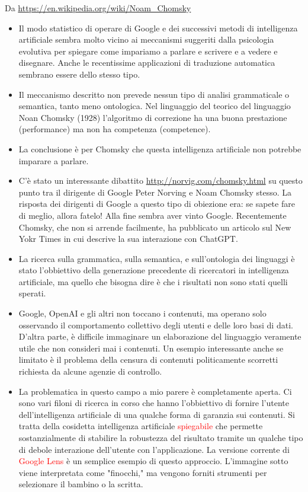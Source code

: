 \documentclass[xcolor=svgnames]{beamer}
\newcommand{\rosso}[1]{\textcolor{red}{#1}}
\renewcommand{\emph}{\rosso}
\begin{document}
\begin{frame}
  {\tiny Da \url{https://en.wikipedia.org/wiki/Noam_Chomsky}}
  
\begin{itemize}
    \item Il modo statistico di operare di Google e dei successivi metodi di intelligenza artificiale sembra molto vicino ai meccanismi suggeriti dalla psicologia evolutiva per spiegare come impariamo a parlare e scrivere e a vedere e disegnare. Anche le recentissime applicazioni di traduzione automatica sembrano essere dello stesso tipo.
    
\item Il meccanismo descritto non prevede nessun tipo di analisi grammaticale o semantica, tanto meno ontologica. Nel linguaggio del teorico del linguaggio Noan Chomsky (1928) l'algoritmo di correzione ha una buona prestazione (performance) ma non ha competenza (competence).

\item La conclusione è per Chomsky che questa intelligenza artificiale non potrebbe imparare a parlare. 

\item C'è stato un interessante dibattito {\tiny \url{http://norvig.com/chomsky.html}} su questo punto tra il dirigente di Google Peter Norving e Noam Chomsky stesso. La risposta dei dirigenti di Google a questo tipo di obiezione era: se sapete fare di meglio, allora fatelo! Alla fine sembra aver vinto Google. Recentemente Chomsky, che non si arrende facilmente, ha pubblicato un articolo sul New Yokr Times in cui descrive la sua interazione con ChatGPT.

\item La ricerca sulla grammatica, sulla semantica, e sull'ontologia dei linguaggi è stato l'obbiettivo della generazione precedente di ricercatori in intelligenza artificiale, ma quello che bisogna dire è che i risultati non sono stati quelli sperati.

\item Google, OpenAI e gli altri  non toccano i contenuti, ma operano solo osservando il comportamento collettivo degli utenti e delle loro basi di dati. D'altra parte, è difficile immaginare un elaborazione del linguaggio veramente utile che non consideri mai i contenuti. Un esempio interessante anche se limitato è il problema della censura di contenuti politicamente scorretti richiesta da alcune agenzie di controllo.

\item La problematica in questo campo a mio parere è completamente aperta. Ci sono vari filoni di ricerca in corso che hanno l'obbiettivo di fornire l'utente dell'intelligenza artificiale di una qualche forma di garanzia sui contenuti. Si tratta della cosidetta intelligenza artificiale \emph{spiegabile} che permette sostanzialmente di stabilire la robustezza del risultato tramite un qualche tipo di debole interazione dell'utente con l'applicazione. La versione corrente di \emph{Google Lens} è un semplice esempio di questo approccio. L'immagine sotto viene interpretata come "finocchi," ma vengono forniti strumenti per selezionare il bambino o la scritta.
\end{itemize}


\end{frame}
\end{document}
